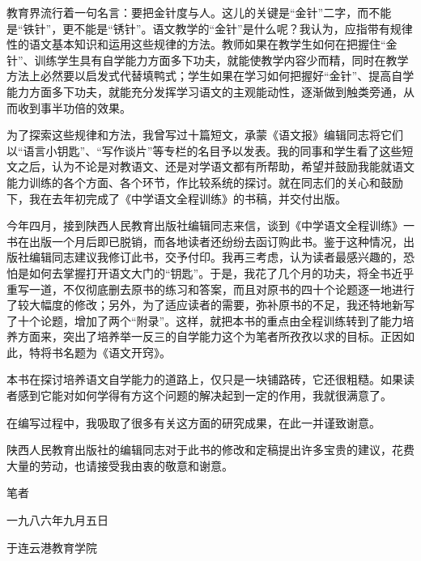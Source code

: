 教育界流行着一句名言：要把金针度与人。这儿的关键是“金针”二字，而不能是“铁针”，更不能是“锈针”。语文教学的“金针”是什么呢？我认为，应指带有规律性的语文基本知识和运用这些规律的方法。教师如果在教学生如何在把握住“金针”、训练学生具有自学能力方面多下功夫，就能使教学内容少而精，同时在教学方法上必然要以启发式代替填鸭式；学生如果在学习如何把握好“金针”、提高自学能力方面多下功夫，就能充分发挥学习语文的主观能动性，逐渐做到触类旁通，从而收到事半功倍的效果。

为了探索这些规律和方法，我曾写过十篇短文，承蒙《语文报》编辑同志将它们以“语言小钥匙”、“写作谈片”等专栏的名目予以发表。我的同事和学生看了这些短文之后，认为不论是对教语文、还是对学语文都有所帮助，希望并鼓励我能就语文能力训练的各个方面、各个环节，作比较系统的探讨。就在同志们的关心和鼓励下，我在去年初完成了《中学语文全程训练》的书稿，并交付出版。

今年四月，接到陕西人民教育出版社编辑同志来信，谈到《中学语文全程训练》一书在出版一个月后即已脱销，而各地读者还纷纷去函订购此书。鉴于这种情况，出版社编辑同志建议我修订此书，交予付印。我再三考虑，认为读者最感兴趣的，恐怕是如何去掌握打开语文大门的“钥匙”。于是，我花了几个月的功夫，将全书近乎重写一道，不仅彻底删去原书的练习和答案，而且对原书的四十个论题逐一地进行了较大幅度的修改；另外，为了适应读者的需要，弥补原书的不足，我还特地新写了十个论题，增加了两个“附录”。这样，就把本书的重点由全程训练转到了能力培养方面来，突出了培养举一反三的自学能力这个为笔者所孜孜以求的目标。正因如此，特将书名题为《语文开窍》。

本书在探讨培养语文自学能力的道路上，仅只是一块铺路砖，它还很粗糙。如果读者感到它能对如何学得有方这个问题的解决起到一定的作用，我就很满意了。

在编写过程中，我吸取了很多有关这方面的研究成果，在此一并谨致谢意。

陕西人民教育出版社的编辑同志对于此书的修改和定稿提出许多宝贵的建议，花费大量的劳动，也请接受我由衷的敬意和谢意。
\begin{flushright}
	笔\hspace{1em}者\hspace{3em}
	
	一九八六年九月五日\hspace{4em}
	
	于连云港教育学院
\end{flushright}
